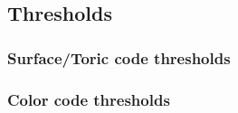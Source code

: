 \subsection{Thresholds}
\subsubsection{Surface/Toric code thresholds}\label{App: surface_thresholding}

\subsubsection{Color code thresholds}\label{App: color_thresholding}
